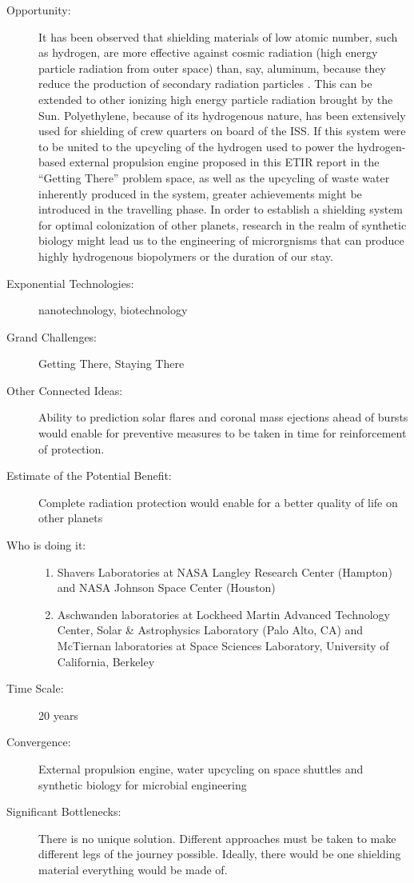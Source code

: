 \begin{description}
\item[Opportunity:] It has been  observed that shielding materials of low atomic number, such as  hydrogen, are more effective against cosmic radiation (high energy  particle radiation from outer space) than, say, aluminum, because they  reduce the production of secondary radiation particles \cite{Aschwanden2010}. This can be extended to other ionizing high energy  particle radiation brought by the Sun. Polyethylene, because of its  hydrogenous nature, has been extensively used for shielding of crew  quarters on board of the ISS. If this system were to be united to the  upcycling of the hydrogen used to power the hydrogen-based external  propulsion engine proposed in this ETIR report in the ``Getting There''  problem space, as well as the upcycling of waste water inherently  produced in the system, greater achievements might be introduced in the  travelling phase. In order to establish a shielding system for optimal  colonization of other planets, research in the realm of synthetic  biology might lead us to the engineering of microrgnisms that can  produce highly hydrogenous biopolymers or the duration of our stay.  
 
\item[Exponential Technologies:]  nanotechnology, biotechnology
 
\item[Grand Challenges:] Getting  There, Staying There
 
\item[Other Connected Ideas:]  Ability to prediction solar flares and coronal mass ejections ahead of  bursts would enable for preventive measures to be taken in time for  reinforcement of protection. 
 
\item[Estimate of the Potential  Benefit:] Complete radiation protection would enable for a better  quality of life on other planets
 
\item[Who is doing it:] 
\hfill\begin{enumerate}
\item Shavers Laboratories at NASA  Langley Research Center (Hampton) and NASA Johnson Space Center  (Houston)
\item Aschwanden laboratories at  Lockheed Martin Advanced Technology Center, Solar \& Astrophysics  Laboratory (Palo Alto, CA) and McTiernan laboratories at Space Sciences  Laboratory, University of California, Berkeley
\end{enumerate}
 
\item[Time Scale:] 20 years
 
\item[Convergence:] External  propulsion engine, water upcycling on space shuttles and synthetic  biology for microbial engineering 
 
\item[Significant Bottlenecks:]  There is no unique solution. Different approaches must be taken to make  different legs of the journey possible. Ideally, there would be one  shielding material everything would be made of.
   \end{description}
 
